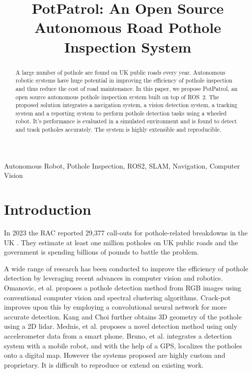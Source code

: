 \documentclass[conference]{IEEEtran}
\begin{document}
\title{PotPatrol: An Open Source Autonomous Road Pothole Inspection System}

\author{
}

\maketitle

\begin{abstract}
A large number of pothole are found on UK public roads every year. Autonomous robotic systems have huge potential in improving the efficiency of pothole inspection and thus reduce the cost of road maintenance. In this paper, we propose PotPatrol, an open source autonomous pothole inspection system built on top of ROS~2. The proposed solution integrates a navigation system, a vision detection system, a tracking system and a reporting system to perform pothole detection tasks using a wheeled robot. It's performance is evaluated in a simulated environment and is found to detect and track potholes accurately. The system is highly extensible and reproducible.
\end{abstract}

\begin{IEEEkeywords}
Autonomous Robot, Pothole Inspection, ROS2, SLAM, Navigation, Computer Vision
\end{IEEEkeywords}

\section{Introduction}

In 2023 the RAC reported 29,377 call-outs for pothole-related breakdowns in the UK \cite{RACPotholeIndex}. They estimate at least one million potholes on UK public roads and the government is spending billions of pounds to battle the problem.

A wide range of research has been conducted to improve the efficiency of pothole detection by leveraging recent advances in computer vision and robotics. Omanovic, et al.\cite{omanovicPotholeDetectionImage2013} proposes a pothole detection method from RGB images using conventional computer vision and spectral clustering algorithms. Crack-pot \cite{anandCrackpotAutonomousRoad2018} improves upon this by employing a convolutional neural network for more accurate detection. Kang and Choi\cite{kangPotholeDetectionSystem2017} further obtains 3D geometry of the pothole using a 2D lidar. Mednis, et al.\cite{5982206} proposes a novel detection method using only accelerometer data from a smart phone.
Bruno, et al.\cite{brunoRobotizedRaspberryBasedSystem2023} integrates a detection system with a mobile robot, and with the help of a GPS, localizes the potholes onto a digital map. However the systems proposed are highly custom and proprietary. It is difficult to reproduce or extend on existing work.
\end{document}
